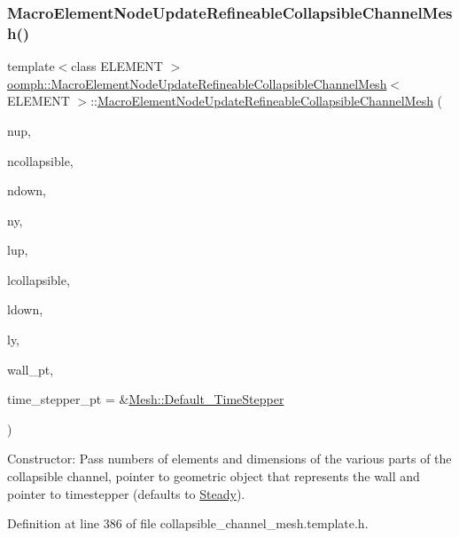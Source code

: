 \subsubsection{\texorpdfstring{Macro\+Element\+Node\+Update\+Refineable\+Collapsible\+Channel\+Mesh()}{MacroElementNodeUpdateRefineableCollapsibleChannelMesh()}}
{\footnotesize\ttfamily template$<$class E\+L\+E\+M\+E\+NT $>$ \\
\hyperlink{classoomph_1_1MacroElementNodeUpdateRefineableCollapsibleChannelMesh}{oomph\+::\+Macro\+Element\+Node\+Update\+Refineable\+Collapsible\+Channel\+Mesh}$<$ E\+L\+E\+M\+E\+NT $>$\+::\hyperlink{classoomph_1_1MacroElementNodeUpdateRefineableCollapsibleChannelMesh}{Macro\+Element\+Node\+Update\+Refineable\+Collapsible\+Channel\+Mesh} (\begin{DoxyParamCaption}\item[{const unsigned \&}]{nup,  }\item[{const unsigned \&}]{ncollapsible,  }\item[{const unsigned \&}]{ndown,  }\item[{const unsigned \&}]{ny,  }\item[{const double \&}]{lup,  }\item[{const double \&}]{lcollapsible,  }\item[{const double \&}]{ldown,  }\item[{const double \&}]{ly,  }\item[{\hyperlink{classoomph_1_1GeomObject}{Geom\+Object} $\ast$}]{wall\+\_\+pt,  }\item[{\hyperlink{classoomph_1_1TimeStepper}{Time\+Stepper} $\ast$}]{time\+\_\+stepper\+\_\+pt = {\ttfamily \&\hyperlink{classoomph_1_1Mesh_a12243d0fee2b1fcee729ee5a4777ea10}{Mesh\+::\+Default\+\_\+\+Time\+Stepper}} }\end{DoxyParamCaption})\hspace{0.3cm}{\ttfamily [inline]}}



Constructor\+: Pass numbers of elements and dimensions of the various parts of the collapsible channel, pointer to geometric object that represents the wall and pointer to timestepper (defaults to \hyperlink{classoomph_1_1Steady}{Steady}). 



Definition at line 386 of file collapsible\+\_\+channel\+\_\+mesh.\+template.\+h.

\mbox{\label{classoomph_1_1MacroElementNodeUpdateRefineableCollapsibleChannelMesh_a5f0960e124d26e10cc70e2143744a07f}} 
